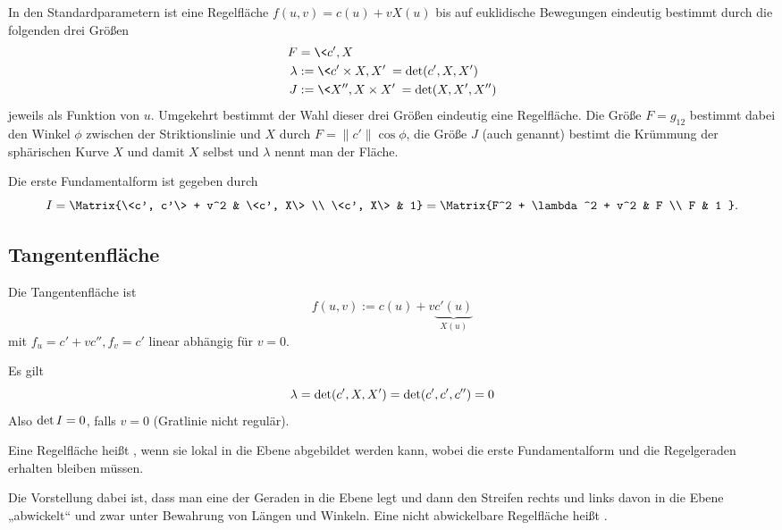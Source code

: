 \begin{st}
	In den  Standardparametern ist eine Regelfläche $f(u, v) = c(u) + vX(u)$ bis auf euklidische Bewegungen eindeutig bestimmt durch die folgenden drei Größen
	\begin{align*}
		F &= \<c', X\> \\
		\lambda &:= \<c' \times X, X'\> = \det(c', X, X') \\
		J &:= \<X'', X \times X'\> = \det(X, X', X'') \\
	\end{align*}
	jeweils als Funktion von $u$.
	Umgekehrt bestimmt der Wahl dieser drei Größen eindeutig eine Regelfläche.
	Die Größe $F = g_{12}$ bestimmt dabei den Winkel $\phi$ zwischen der Striktionslinie und $X$ durch $F = \|c'\| \cos \phi$, die Größe $J$ (auch  genannt) bestimt die Krümmung der sphärischen Kurve $X$ und damit $X$ selbst und $\lambda$ nennt man  der Fläche.
\end{st}

Die erste Fundamentalform ist gegeben durch
\[
	I = \Matrix{\<c', c'\> + v^2  & \<c', X\> \\ \<c', X\> & 1}
	= \Matrix{F^2 + \lambda^2 + v^2 & F \\ F & 1 }.
\]

\subsection{Tangentenfläche}

Die Tangentenfläche ist
\[
	f(u, v) := c(u) + v \underbrace{c'(u)}_{X(u)}
\]
mit $f_u = c' + v c'', f_v = c'$ linear abhängig für $v = 0$.

Es gilt
\[
	\lambda = \det(c', X, X')
	= \det(c', c', c'')
	= 0
\]
Also $\det I = 0$, falls $v = 0$ (Gratlinie nicht regulär).

\begin{df}
	Eine Regelfläche heißt , wenn sie lokal in die Ebene abgebildet werden kann, wobei die erste Fundamentalform und die Regelgeraden erhalten bleiben müssen.

	Die Vorstellung dabei ist, dass man eine der Geraden in die Ebene legt und dann den Streifen rechts und links davon in die Ebene „abwickelt“ und zwar unter Bewahrung von Längen und Winkeln.
	Eine nicht abwickelbare Regelfläche heißt .
\end{df}

